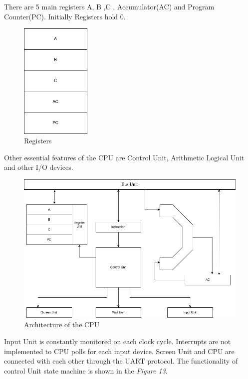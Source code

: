 \documentclass[a4paper,12pt]{article}
\begin{document}
\begin{itemize}
         There are 5 main registers A, B ,C , Accumulator(AC) and Program Counter(PC). Initially Registers hold 0. 

        \begin{figure}[H]
            \centering
            \includegraphics[width=0.3\textwidth ]{./images/registers.png}
            \caption{Registers}
        \end{figure}
    \end{itemize}

    Other essential features of the CPU are Control Unit, Arithmetic Logical Unit and other I/O devices. 

    \begin{figure}[H]
        \centering
        \includegraphics[width=1\textwidth ]{./images/architecture.png}
        \caption{Architecture of the CPU}
    \end{figure}

    Input Unit is constantly monitored on each clock cycle. Interrupts are not implemented to CPU polls for each input device. Screen Unit and CPU are connected with each other through the UART protocol. The functionality of control Unit state machine is shown in the \textit{Figure 13}. 
\end{document}
